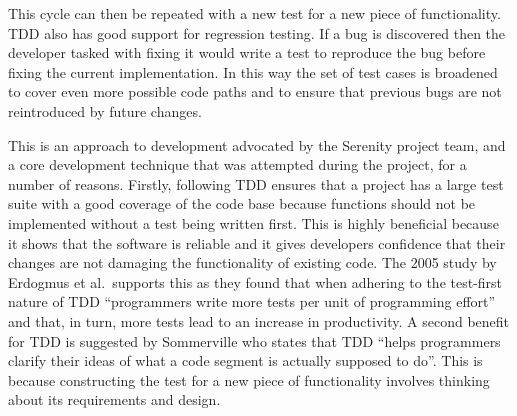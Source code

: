 This cycle can then be repeated with a new test for a new piece of functionality.
TDD also has good support for regression testing. If a bug is discovered then the developer
tasked with fixing it would write a test to reproduce the bug before fixing the current
implementation. In this way the set of test cases is broadened to cover even more
possible code paths and to ensure that previous bugs are not reintroduced by future
changes.

This is an approach to development advocated by the Serenity project team, and a core
development technique that was attempted during the project,
for a number of reasons. Firstly, following TDD ensures that a project has a large
test suite with a good coverage of the code base because functions should not be
implemented without a test being written first. This is highly beneficial because
it shows that the software is reliable and it gives developers confidence that their
changes are not damaging the functionality of existing code. The 2005 study by
Erdogmus et al.\ supports this as they found that when adhering to the test-first
nature of TDD ``programmers write more tests per unit of programming effort'' and
that, in turn, more tests lead to an increase in productivity.\cite{erdogmus2005}
A second benefit for TDD is suggested by Sommerville who states that TDD ``helps
programmers clarify their ideas of what a code segment is actually supposed to
do''. This is because constructing the test for
a new piece of functionality involves thinking about its requirements and design.


